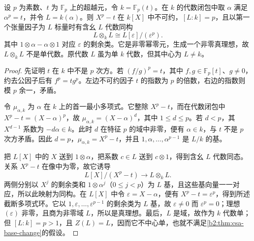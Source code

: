 \begin{proposition}[不可分标量扩张后的非单性]\label{b2:prop:inseparable-base-change-counterexample}
	设 \(p\) 为素数、\(t\) 为 \(\mathbb F_p\) 上的超越元，令 \(k=\mathbb F_p(t)\)。在 \(k\) 的代数闭包中取 \(\alpha\) 满足 \(\alpha^p=t\)，并令 \(L=k(\alpha)\)。则 \(X^p-t\) 在 \(k[X]\) 中不可约，\([L:k]=p\)，且以第一个张量因子为 \(L\) 标量时有含幺 \(L\) 代数同构
	\[
		L\otimes_kL\cong L[\varepsilon]/(\varepsilon^p).
	\]
	其中 \(1\otimes\alpha-\alpha\otimes1\) 对应 \(\varepsilon\) 的剩余类。它是非零幂零元，生成一个非零真理想，故 \(L\otimes_kL\) 不是单代数。原代数 \(L\) 虽为单 \(k\) 代数，但其中心为 \(L\ne k\)。
\end{proposition}
\begin{proof}
	先证明 \(t\) 在 \(k\) 中不是 \(p\) 次方。若 \((f/g)^p=t\)，其中 \(f,g\in\mathbb F_p[t]\)、\(g\ne0\)，约去公因子后有 \(f^p=tg^p\)。左边不可约因子 \(t\) 的指数为 \(p\) 的倍数，右边的指数则模 \(p\) 余一，矛盾。

	令 \(\mu_{\alpha,k}\) 为 \(\alpha\) 在 \(k\) 上的首一最小多项式。它整除 \(X^p-t\)，而在代数闭包中 \(X^p-t=(X-\alpha)^p\)，故 \(\mu_{\alpha,k}=(X-\alpha)^d\)，其中 \(1\le d\le p\)。若 \(d<p\)，其 \(X^{d-1}\) 系数为 \(-d\alpha\in k\)。此时 \(d\) 在特征 \(p\) 的域中非零，便有 \(\alpha\in k\)，与 \(t\) 不是 \(p\) 次方矛盾。因此 \(d=p\)，\(\mu_{\alpha,k}=X^p-t\)，并且 \(1,\alpha,\ldots,\alpha^{p-1}\) 是 \(L/k\) 的基。

	把 \(L[X]\) 中的 \(X\) 送到 \(1\otimes\alpha\)，把系数 \(c\in L\) 送到 \(c\otimes1\)，得到含幺 \(L\) 代数同态。关系 \(X^p-t\) 在像中为零，故它诱导
	\[
		L[X]/(X^p-t)\longrightarrow L\otimes_kL.
	\]
	两侧分别以 \(X^j\) 的剩余类和 \(1\otimes\alpha^j\)（\(0\le j<p\)）为 \(L\) 基，且这些基向量一一对应，所以此映射为同构。在 \(L[X]\) 中令 \(\varepsilon=X-\alpha\)，便有 \(X^p-t=\varepsilon^p\)，得到所述截断多项式环。它以 \(1,\varepsilon,\ldots,\varepsilon^{p-1}\) 的剩余类为 \(L\) 基，故 \(\varepsilon\ne0\) 而 \(\varepsilon^p=0\)；理想 \((\varepsilon)\) 非零，且商为非零域 \(L\)，所以是真理想。最后，\(L\) 是域，故作为 \(k\) 代数单；但 \([L:k]=p>1\)，且 \(Z(L)=L\)，因而它不中心单，也就不满足\cref{b2:thm:csa-base-change}的假设。
\end{proof}
